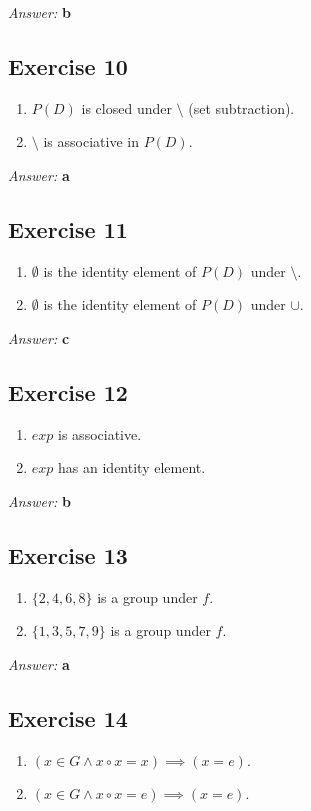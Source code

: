 \documentclass[11pt]{article}
\begin{document}
\emph{Answer:} \textbf{b}
\subsection{Exercise 10}
\label{sec-2-10}
\begin{enumerate}
\item $P(D)$ is closed under $\setminus$ (set subtraction).
\item $\setminus$ is associative in $P(D)$.
\end{enumerate}

\emph{Answer:} \textbf{a}
\subsection{Exercise 11}
\label{sec-2-11}
\begin{enumerate}
\item $\emptyset$ is the identity element of $P(D)$ under $\setminus$.
\item $\emptyset$ is the identity element of $P(D)$ under $\cup$.
\end{enumerate}

\emph{Answer:} \textbf{c}
\subsection{Exercise 12}
\label{sec-2-12}
\begin{enumerate}
\item $exp$ is associative.
\item $exp$ has an identity element.
\end{enumerate}

\emph{Answer:} \textbf{b}
\subsection{Exercise 13}
\label{sec-2-13}
\begin{enumerate}
\item $\{2, 4, 6, 8\}$ is a group under $f$.
\item $\{1, 3, 5, 7, 9\}$ is a group under $f$.
\end{enumerate}

\emph{Answer:} \textbf{a}
\subsection{Exercise 14}
\label{sec-2-14}
\begin{enumerate}
\item $(x \in G \land x \circ x = x) \implies (x = e)$.
\item $(x \in G \land x \circ x = e) \implies (x = e)$.
\end{enumerate}
\end{document}
